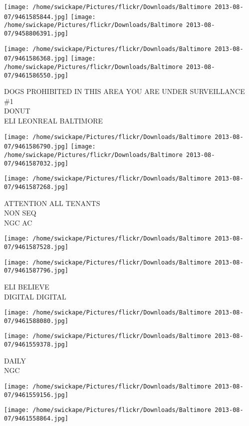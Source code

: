\documentclass[10pt,letterpaper]{article}
\begin{document}
\texttt{[image: /home/swickape/Pictures/flickr/Downloads/Baltimore 2013-08-07/9461585844.jpg]}
\texttt{[image: /home/swickape/Pictures/flickr/Downloads/Baltimore 2013-08-07/9458806391.jpg]}

\texttt{[image: /home/swickape/Pictures/flickr/Downloads/Baltimore 2013-08-07/9461586368.jpg]}
\texttt{[image: /home/swickape/Pictures/flickr/Downloads/Baltimore 2013-08-07/9461586550.jpg]}

DOGS PROHIBITED IN THIS AREA YOU ARE UNDER SURVEILLANCE\\
\#1\\
DONUT\\
ELI LEONREAL BALTIMORE
\pagebreak

\texttt{[image: /home/swickape/Pictures/flickr/Downloads/Baltimore 2013-08-07/9461586790.jpg]}
\texttt{[image: /home/swickape/Pictures/flickr/Downloads/Baltimore 2013-08-07/9461587032.jpg]}

\vspace{0.25in}
\texttt{[image: /home/swickape/Pictures/flickr/Downloads/Baltimore 2013-08-07/9461587268.jpg]}

ATTENTION ALL TENANTS\\
NON SEQ\\
NGC AC
\pagebreak

\texttt{[image: /home/swickape/Pictures/flickr/Downloads/Baltimore 2013-08-07/9461587528.jpg]}

\vspace{0.25in}
\texttt{[image: /home/swickape/Pictures/flickr/Downloads/Baltimore 2013-08-07/9461587796.jpg]}

ELI BELIEVE\\
DIGITAL DIGITAL
\pagebreak

\texttt{[image: /home/swickape/Pictures/flickr/Downloads/Baltimore 2013-08-07/9461588080.jpg]}

\vspace{0.25in}
\texttt{[image: /home/swickape/Pictures/flickr/Downloads/Baltimore 2013-08-07/9461559378.jpg]}

DAILY\\
NGC
\pagebreak

\texttt{[image: /home/swickape/Pictures/flickr/Downloads/Baltimore 2013-08-07/9461559156.jpg]}

\vspace{0.25in}
\texttt{[image: /home/swickape/Pictures/flickr/Downloads/Baltimore 2013-08-07/9461558864.jpg]}
\end{document}
